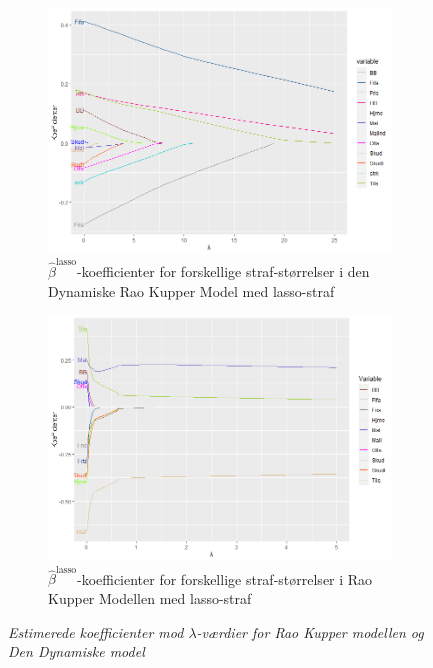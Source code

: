 \documentclass[11pt,a4paper]{article}
\begin{document}
\begin{figure}[h!]
  \centering
  \begin{subfigure}[b]{0.425\linewidth}
    \includegraphics[width=\textwidth]{LINEPLOTDYNALPHA.png}
    \caption{$\hat{\beta}^{\text{lasso}}$-koefficienter for forskellige straf-størrelser i den Dynamiske Rao Kupper Model med lasso-straf}
    \label{fig:DBetaLasso}
  \end{subfigure}
  \hspace{0.2cm}
  \begin{subfigure}[b]{0.425\linewidth}
    \includegraphics[width=\textwidth]{SKL2.png}
    \caption{$\hat{\beta}^{\text{lasso}}$-koefficienter for forskellige straf-størrelser i Rao Kupper Modellen med lasso-straf}
    \label{fig:StatiskLine}
  \end{subfigure}
\caption{\textit{Estimerede koefficienter mod $\lambda$-værdier for Rao Kupper modellen og Den Dynamiske model}}
  \label{fig:KoefficienterLambda}
\end{figure}
\end{document}
